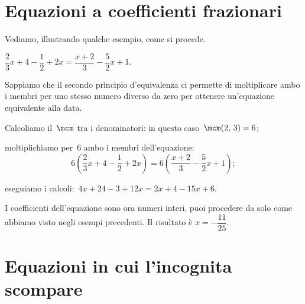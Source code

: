 \ovalbox{\risolvii \ref{ese:15.14}, \ref{ese:15.15}, \ref{ese:15.16}, \ref{ese:15.17}, \ref{ese:15.18}}

\section{Equazioni a coefficienti frazionari}
Vediamo, illustrando qualche esempio, come si procede.

\begin{exrig}
 \begin{esempio}
$\dfrac{2}{3}x+4-\dfrac{1}{2}+2x=\dfrac{x+2}{3}-\dfrac{5}{2}x+1$.

Sappiamo che il secondo principio d'equivalenza ci
permette di moltiplicare ambo i membri per uno stesso numero diverso da
zero per ottenere un'equazione equivalente alla data.
\begin{enumeratea}
\item Calcoliamo il~$\mcm$ tra i denominatori: in questo
caso~$\mcm(2\text{,~}3) = 6$;

\item moltiplichiamo per~6 ambo i membri
dell'equazione:
\[6\left(\dfrac{2}{3}x+4-\dfrac{1}{2}+2x\right)=6\left(\dfrac{x+2}{3}-\dfrac{5}{2}x+1\right);\]

\item eseguiamo i calcoli:~$4x+24-3+12x=2x+4-15x+6$.
\end{enumeratea}

I coefficienti dell'equazione sono ora numeri interi,
puoi procedere da solo come abbiamo visto negli esempi precedenti. Il risultato è $x=-\dfrac{11}{25}$.
\end{esempio}
\end{exrig}

\ovalbox{\risolvi \ref{ese:15.19}}

\section{Equazioni in cui l'incognita scompare}

